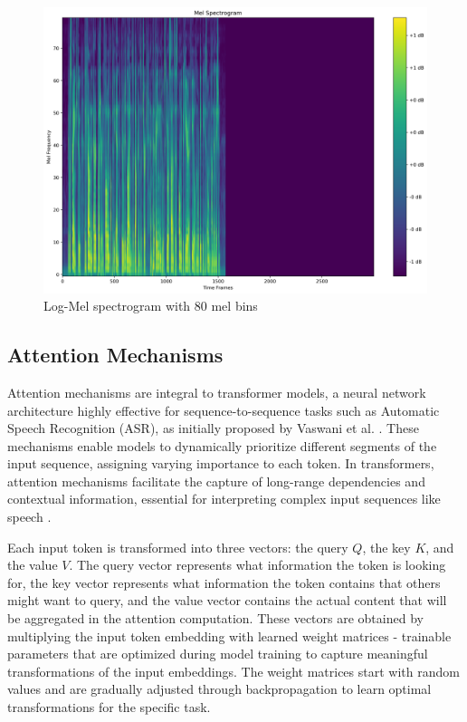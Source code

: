 \documentclass[../report.tex]{subfiles}
\begin{document}
    \begin{figure}[ht]
        \centering
        \includegraphics[width=0.8\linewidth]{../figures/mel_spectrogram.png}
        \caption{Log-Mel spectrogram with 80 mel bins}
        \label{fig:log_mel_spectrogram}
    \end{figure}

    \subsection{Attention Mechanisms}
    Attention mechanisms are integral to transformer models, a neural network architecture highly effective for sequence-to-sequence tasks such as Automatic Speech Recognition (ASR), as initially proposed by Vaswani et al. \cite{vaswani2017attention}. These mechanisms enable models to dynamically prioritize different segments of the input sequence, assigning varying importance to each token. In transformers, attention mechanisms facilitate the capture of long-range dependencies and contextual information, essential for interpreting complex input sequences like speech \cite{vaswani2017attention}.

    Each input token is transformed into three vectors: the query $Q$, the key $K$, and the value $V$. The query vector represents what information the token is looking for, the key vector represents what information the token contains that others might want to query, and the value vector contains the actual content that will be aggregated in the attention computation. These vectors are obtained by multiplying the input token embedding with learned weight matrices - trainable parameters that are optimized during model training to capture meaningful transformations of the input embeddings. The weight matrices start with random values and are gradually adjusted through backpropagation to learn optimal transformations for the specific task.
\end{document}
